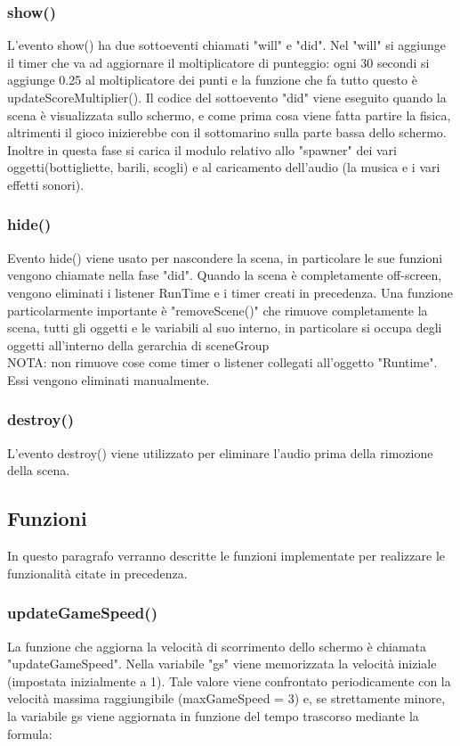 \documentclass[15pt]{article}
\begin{document}
\subsubsection{show()}
L'evento show() ha due sottoeventi chiamati "will" e "did". Nel "will" si aggiunge il timer che va ad aggiornare il moltiplicatore di punteggio: ogni 30 secondi si aggiunge 0.25 al moltiplicatore dei punti e la funzione che fa tutto questo è updateScoreMultiplier(). Il codice del sottoevento "did" viene eseguito quando la scena è visualizzata sullo schermo, e come prima cosa viene fatta partire la fisica, altrimenti il gioco inizierebbe con il sottomarino sulla parte bassa dello schermo. Inoltre in questa fase si carica il modulo relativo allo "spawner" dei vari oggetti(bottigliette, barili, scogli) e al caricamento dell'audio (la musica e i vari effetti sonori).

\subsubsection{hide()}
Evento hide() viene usato per nascondere la scena, in particolare le sue funzioni vengono chiamate nella fase "did". Quando la scena è completamente off-screen, vengono eliminati i listener RunTime e i timer creati in precedenza. Una funzione particolarmente importante è "removeScene()" che rimuove completamente la scena, tutti gli oggetti e le variabili al suo interno,
in particolare si occupa degli oggetti all'interno della gerarchia di sceneGroup 
\\

NOTA: non rimuove cose come timer o listener collegati all'oggetto "Runtime". Essi vengono eliminati manualmente.

\subsubsection{destroy()}
L'evento destroy() viene utilizzato per eliminare l'audio prima della rimozione della scena.

\subsection{Funzioni}
In questo paragrafo verranno descritte le funzioni implementate per realizzare le funzionalità citate in precedenza.
\subsubsection{updateGameSpeed()}
La funzione che aggiorna la velocità di scorrimento dello schermo è chiamata "updateGameSpeed". Nella variabile "gs" viene memorizzata la velocità iniziale (impostata inizialmente a 1). Tale valore viene confrontato periodicamente con la velocità massima raggiungibile (maxGameSpeed = 3) e, se strettamente minore, la variabile gs viene aggiornata in funzione del tempo trascorso mediante la formula:\\
\end{document}

